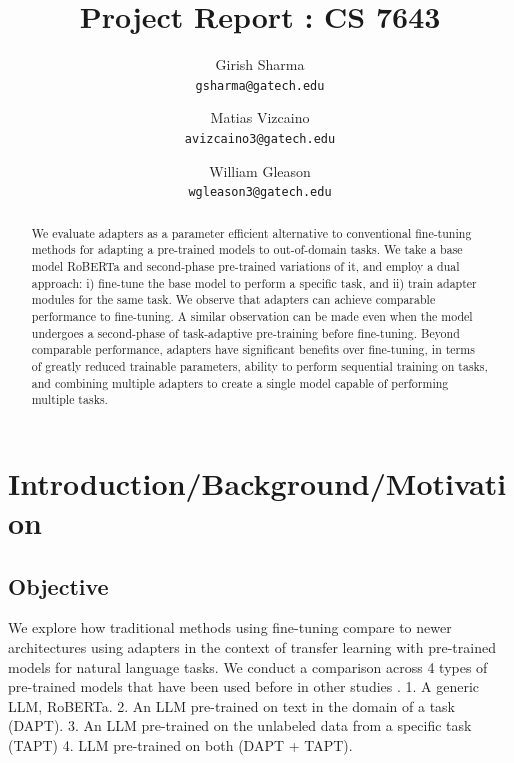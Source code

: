 \documentclass[10pt,twocolumn,letterpaper]{article}
\begin{document}
\title{Project Report : CS 7643}

\author{Girish Sharma\\
{\tt\small gsharma@gatech.edu}
\and
Matias Vizcaino \\
{\tt\small avizcaino3@gatech.edu}
\and
William Gleason\\
{\tt\small wgleason3@gatech.edu}
}

\maketitle

\begin{abstract}

   We evaluate adapters as a parameter efficient alternative to conventional fine-tuning methods for adapting a pre-trained models to out-of-domain tasks. We take a base model RoBERTa and second-phase pre-trained variations of it, and employ a dual approach: i) fine-tune the base model to perform a specific task, and ii) train adapter modules for the same task. We observe that adapters can achieve comparable performance to fine-tuning. A similar observation can be made even when the model undergoes a second-phase of task-adaptive pre-training before fine-tuning. Beyond comparable performance, adapters have significant benefits over fine-tuning, in terms of greatly reduced trainable parameters, ability to perform sequential training on tasks, and combining multiple adapters to create a single model capable of performing multiple tasks.
\end{abstract}

\section{Introduction/Background/Motivation}

\subsection{Objective} We explore how traditional methods using fine-tuning compare to newer architectures using adapters in the context of transfer learning with pre-trained models for natural language tasks. We conduct a comparison across 4 types of pre-trained models that have been used before in other studies \cite{gururangan2020dont}. 1. A generic LLM, RoBERTa. 2. An LLM pre-trained on text in the domain of a task (DAPT). 3. An LLM pre-trained on the unlabeled data from a specific task (TAPT) 4. LLM pre-trained on both (DAPT + TAPT). 
\end{document}
